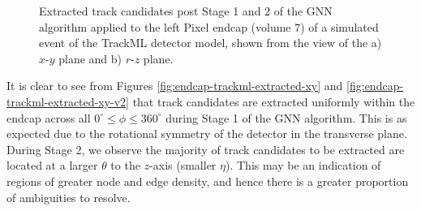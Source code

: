 \begin{figure}[htbp]%
    \centering
    \hfill
    \caption{Extracted track candidates post Stage 1 and 2 of the GNN algorithm applied to the left Pixel endcap (volume 7) of a simulated event of the TrackML detector model, shown from the view of the a) $x$-$y$ plane and b) $r$-$z$ plane.}%
    \label{fig:trackml-results-endcap-extracted-v2}%
\end{figure}

It is clear to see from Figures \ref{fig:endcap-trackml-extracted-xy} and \ref{fig:endcap-trackml-extracted-xy-v2} that track candidates are extracted uniformly within the endcap across all $ 0^{\circ} \leq \phi \leq 360^{\circ}$ during Stage 1 of the GNN algorithm. This is as expected due to the rotational symmetry of the detector in the transverse plane. During Stage 2, we observe the majority of track candidates to be extracted are located at a larger $\theta$ to the $z$-axis (smaller $\eta$). This may be an indication of regions of greater node and edge density, and hence there is a greater proportion of ambiguities to resolve.

